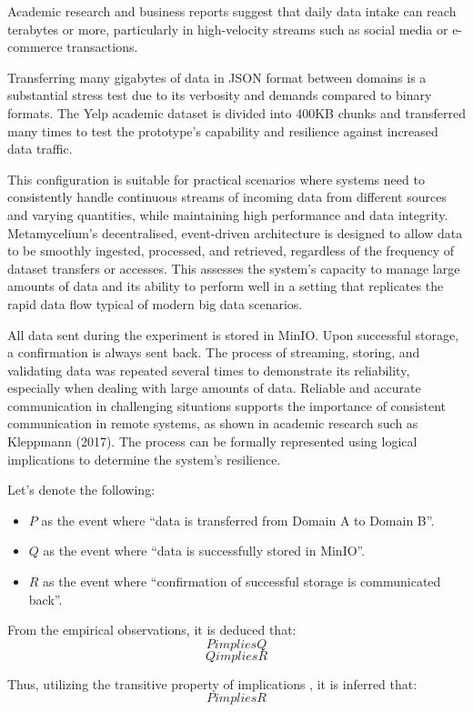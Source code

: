 \documentclass[preprint,12pt]{elsarticle}
\begin{document}
Academic research and business reports suggest that daily data intake can reach terabytes or more, particularly in high-velocity streams such as social media or e-commerce transactions. 

Transferring many gigabytes of data in JSON format between domains is a substantial stress test due to its verbosity and demands compared to binary formats. The Yelp academic dataset is divided into 400KB chunks and transferred many times to test the prototype's capability and resilience against increased data traffic. 

This configuration is suitable for practical scenarios where systems need to consistently handle continuous streams of incoming data from different sources and varying quantities, while maintaining high performance and data integrity. Metamycelium's decentralised, event-driven architecture is designed to allow data to be smoothly ingested, processed, and retrieved, regardless of the frequency of dataset transfers or accesses. This assesses the system's capacity to manage large amounts of data and its ability to perform well in a setting that replicates the rapid data flow typical of modern big data scenarios.


All data sent during the experiment is stored in MinIO. Upon successful storage, a confirmation is always sent back. The process of streaming, storing, and validating data was repeated several times to demonstrate its reliability, especially when dealing with large amounts of data. Reliable and accurate communication in challenging situations supports the importance of consistent communication in remote systems, as shown in academic research such as Kleppmann (2017). The process can be formally represented using logical implications to determine the system's resilience.

Let's denote the following:
\begin{itemize}
    \item \( P \) as the event where ``data is transferred from Domain A to Domain B''.
    \item \( Q \) as the event where ``data is successfully stored in MinIO''.
    \item \( R \) as the event where ``confirmation of successful storage is communicated back''.
\end{itemize}

From the empirical observations, it is deduced that:
\[ P  implies  Q \]
\[ Q  implies  R \]

Thus, utilizing the transitive property of implications \cite{johnson2019logic}, it is inferred that:
\[ P  implies  R \]
\end{document}
